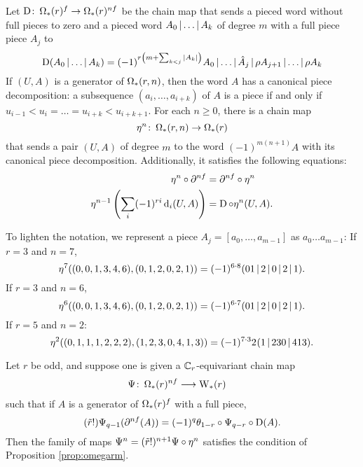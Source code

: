 Let $\operatorname{D} \colon \operatorname{\Omega}_{*}(r)^{f} \to \operatorname{\Omega}_{*}(r)^{nf}$ be the chain map that sends a pieced word without full pieces to zero and a pieced word $A_0\operatorname{|}\dots\operatorname{|} A_k$ of degree $m$ with a full piece piece $A_j$ to
\[
\operatorname{D}(A_0\operatorname{|} \dots\operatorname{|} A_k) = (-1)^{r\left(m+\sum_{k<j} |A_k|\right)} A_0\operatorname{|} \dots\operatorname{|} \hat{A}_{j}\operatorname{|} \rho A_{j+1}\operatorname{|} \dots\operatorname{|} \rho A_k
\]
If $(U,A)$ is a generator of $\operatorname{\Omega}_{*}(r,n)$, then the word $A$ has a canonical piece decomposition: a subsequence $(a_i,\dots,a_{i+k})$ of $A$ is a piece if and only if $u_{i-1}<u_i =\dots= u_{i+k}<u_{i+k+1}$. For each $n \geq 0$, there is a chain map
\begin{equation}\label{eq:eta}
    \eta^n \colon \operatorname{\Omega}_{*}(r,n) \to \operatorname{\Omega}_{*}(r)
\end{equation}
that sends a pair $(U,A)$ of degree $m$ to the word $(-1)^{m(n+1)}A$ with its canonical piece decomposition. Additionally, it satisfies the following equations:
\begin{align}\label{eq:lambda2}
\eta^n\circ \partial^{nf} &= \partial^{nf}\circ \eta^n
\\
\label{eq:lambda0}
	\eta^{n-1}\left(\sum_i (-1)^{ri}\operatorname{d}_i(U,A)\right) &= \operatorname{D}\circ \eta^n(U,A).
\end{align}

\begin{example}\label{example:omegar} To lighten the notation, we represent a piece $A_j = [a_0,\dots,a_{m-1}]$ as $a_0\dots a_{m-1}$: If $r=3$ and $n=7$,
	\[
		\eta^7((0,0,1,3,4,6),(0,1,2,0,2,1)) = (-1)^{6\cdot 8}(01\operatorname{|} 2\operatorname{|} 0\operatorname{|} 2\operatorname{|} 1).
	\]
	If $r=3$ and $n=6$,
	\[
		\eta^6((0,0,1,3,4,6),(0,1,2,0,2,1)) = (-1)^{6\cdot 7}(01\operatorname{|} 2\operatorname{|} 0\operatorname{|} 2\operatorname{|} 1).
	\]
	If $r=5$ and $n=2$:
	\[
		\eta^2((0,1,1,1,2,2,2),(1,2,3,0,4,1,3)) = (-1)^{7\cdot 3} 2^{}(1\operatorname{|} 230\operatorname{|} 413).
	\]
\end{example}

\begin{lemma}\label{lemma:omegar}
	Let $r$ be odd, and suppose one is given a $\mathbb{C}_r$-equivariant chain map
	\begin{align*}
		\Psi \colon \operatorname{\Omega}_{*}(r)^{nf}& \longrightarrow \operatorname{W}_{*}(r)
	\end{align*}
	such that if $A$ is a generator of $\operatorname{\Omega}_{*}(r)^{f}$ with a full piece,
	\begin{equation}\label{eq:lambda}
		(\tilde{r}!)\Psi_{q-1}(\partial^{nf} (A)) = (-1)^q\theta_{1-r}\circ\Psi_{q-r}\circ\operatorname{D}(A).
	\end{equation}
	Then the family of maps $\Psi^n = (\tilde{r}!)^{n+1}\Psi\circ \eta^n$ satisfies the condition of Proposition \ref{prop:omegarm}.
\end{lemma}

